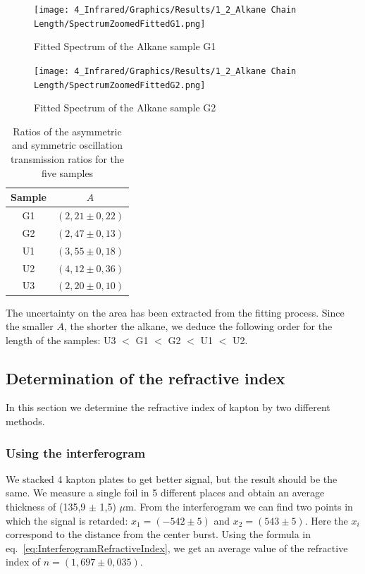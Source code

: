 \documentclass[12pt]{article}
\begin{document}
\begin{figure}[!ht]
    \centering
    \texttt{[image: 4\_Infrared/Graphics/Results/1\_2\_Alkane Chain Length/SpectrumZoomedFittedG1.png]}
    \caption{Fitted Spectrum of the Alkane sample G1}
    \label{fig:FittedSpectrumG1}
\end{figure}
\FloatBarrier

\begin{figure}[!ht]
    \centering
    \texttt{[image: 4\_Infrared/Graphics/Results/1\_2\_Alkane Chain Length/SpectrumZoomedFittedG2.png]}
    \caption{Fitted Spectrum of the Alkane sample G2}
    \label{fig:FittedSpectrumG2}
\end{figure}
\FloatBarrier

\begin{table}[!ht]
    \centering
    \begin{tabular}{|c|c|}
    \hline
        Sample & $A$ \\ \hline \hline
        G1 & $(2,21 \pm 0,22)$ \\ \hline
        G2 & $(2,47 \pm 0,13)$ \\ \hline
        U1 & $(3,55 \pm 0,18)$  \\ \hline
        U2 & $(4,12 \pm 0,36)$  \\ \hline
        U3 & $(2,20 \pm 0,10)$  \\ \hline
    \end{tabular}
    \caption{Ratios of the asymmetric and symmetric oscillation transmission ratios for the five samples}
    \label{tab:AlkaneChainLengthValues}
\end{table}
The uncertainty on the area has been extracted from the fitting process.
Since the smaller $A$, the shorter the alkane, we deduce the following order for the length of the samples: U3 $<$ G1 $<$ G2 $<$ U1 $<$ U2.

\subsection{Determination of the refractive index}

In this section we determine the refractive index of kapton by two different methods.

\subsubsection{Using the interferogram}

We stacked 4 kapton plates to get better signal, but the result should be the same. We measure a single foil in 5 different places and obtain an average thickness of (135,9 $\pm$ 1,5) $\mu$m. From the interferogram we can find two points in which the signal is retarded: $x_1 = (-542 \pm 5)$ and $x_2 = (543 \pm 5)$. Here the $x_i$ correspond to the distance from the center burst. Using the formula in eq.~\ref{eq:InterferogramRefractiveIndex}, we get an average value of the refractive index of $n= (1,697 \pm 0,035)$.
\end{document}
